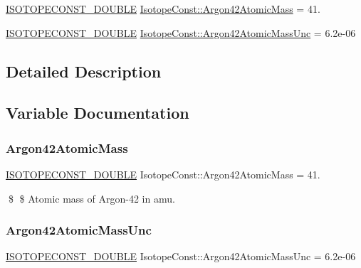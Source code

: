 \begin{DoxyCompactItemize}
\item 
\mbox{\hyperlink{group___isotope_const-_macros_ga8f45a7272ce02c0b4c65c44636ed719a}{I\+S\+O\+T\+O\+P\+E\+C\+O\+N\+S\+T\+\_\+\+D\+O\+U\+B\+LE}} \mbox{\hyperlink{group___isotope_const-_argon-_ar42_ga39da2473e896e80e5ca281047ec1da58}{Isotope\+Const\+::\+Argon42\+Atomic\+Mass}} = 41.
\item 
\mbox{\hyperlink{group___isotope_const-_macros_ga8f45a7272ce02c0b4c65c44636ed719a}{I\+S\+O\+T\+O\+P\+E\+C\+O\+N\+S\+T\+\_\+\+D\+O\+U\+B\+LE}} \mbox{\hyperlink{group___isotope_const-_argon-_ar42_ga75c38406c56ab116515c1a54db4cbd90}{Isotope\+Const\+::\+Argon42\+Atomic\+Mass\+Unc}} = 6.\+2e-\/06
\end{DoxyCompactItemize}


\subsection{Detailed Description}


\subsection{Variable Documentation}
\mbox{\label{group___isotope_const-_argon-_ar42_ga39da2473e896e80e5ca281047ec1da58}} 
\subsubsection{\texorpdfstring{Argon42\+Atomic\+Mass}{Argon42AtomicMass}}
{\footnotesize\ttfamily \mbox{\hyperlink{group___isotope_const-_macros_ga8f45a7272ce02c0b4c65c44636ed719a}{I\+S\+O\+T\+O\+P\+E\+C\+O\+N\+S\+T\+\_\+\+D\+O\+U\+B\+LE}} Isotope\+Const\+::\+Argon42\+Atomic\+Mass = 41.}

\$ \$ Atomic mass of Argon-\/42 in amu. \mbox{\label{group___isotope_const-_argon-_ar42_ga75c38406c56ab116515c1a54db4cbd90}} 
\subsubsection{\texorpdfstring{Argon42\+Atomic\+Mass\+Unc}{Argon42AtomicMassUnc}}
{\footnotesize\ttfamily \mbox{\hyperlink{group___isotope_const-_macros_ga8f45a7272ce02c0b4c65c44636ed719a}{I\+S\+O\+T\+O\+P\+E\+C\+O\+N\+S\+T\+\_\+\+D\+O\+U\+B\+LE}} Isotope\+Const\+::\+Argon42\+Atomic\+Mass\+Unc = 6.\+2e-\/06}

